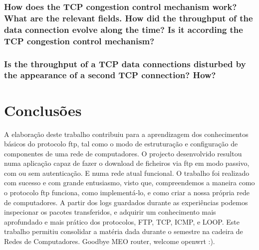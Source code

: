 \documentclass[a4paper]{article}
\begin{document}
\subsubsection{How does the TCP congestion control mechanism work? What are the
relevant fields. How did the throughput of the data connection evolve
along the time? Is it according the TCP congestion control mechanism?}

\subsubsection{Is the throughput of a TCP data connections disturbed by the appearance of a second TCP connection? How?}

\section{Conclusões}
A elaboração deste trabalho contribuiu para a aprendizagem dos conhecimentos
básicos do protocolo ftp, tal como o modo de estruturação e configuração de
componentes de uma rede de computadores. O projecto  desenvolvido resultou numa
aplicação capaz de fazer o download de ficheiros via ftp em modo passivo, com
ou sem autenticação. E numa rede atual funcional. O trabalho foi realizado com
sucesso e com grande entusiasmo, visto que, compreendemos a maneira como o
protocolo ftp funciona, como implementá-lo, e como criar a nossa própria rede de
computadores. A partir dos logs guardados durante as experiências podemos inspecionar
os pacotes transferidos, e adquirir um conhecimento mais aprofundado e mais prático dos protocolos,
FTP, TCP, ICMP, e LOOP. Este trabalho permitiu consolidar a matéria dada durante o semestre na cadeira
de Redes de Computadores. Goodbye MEO router, welcome openwrt :).
\end{document}
